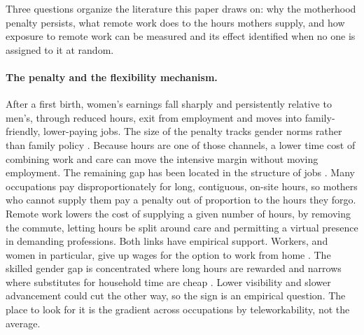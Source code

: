 \documentclass[12pt,a4paper]{article}
\begin{document}
Three questions organize the literature this paper draws on: why the motherhood penalty
persists, what remote work does to the hours mothers supply, and how exposure to remote work can
be measured and its effect identified when no one is assigned to it at random.

\paragraph{The penalty and the flexibility mechanism.}
After a first birth, women's earnings fall sharply and persistently relative to men's, through
reduced hours, exit from employment and moves into family-friendly, lower-paying jobs. The size
of the penalty tracks gender norms rather than family policy
\citep{kleven2019denmark, kleven2019countries}. Because hours are one of those channels, a lower
time cost of combining work and care can move the intensive margin without moving employment.
The remaining gap has been located in the structure of jobs \citep{goldin2014}. Many occupations
pay disproportionately for long, contiguous, on-site hours, so mothers who cannot supply them pay
a penalty out of proportion to the hours they forgo. Remote work lowers the cost of supplying a
given number of hours, by removing the commute, letting hours be split around care and
permitting a virtual presence in demanding professions. Both links have empirical support.
Workers, and women in particular, give up wages for the option to work from home
\citep{maspallais2017}. The skilled gender gap is concentrated where long hours are rewarded and
narrows where substitutes for household time are cheap \citep{cortespan2019}. Lower visibility
and slower advancement could cut the other way, so the sign is an empirical question. The place
to look for it is the gradient across occupations by teleworkability, not the average.
\end{document}
